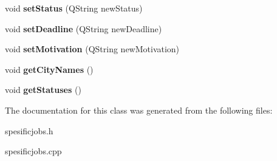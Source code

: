 \begin{DoxyCompactItemize}
\item 
\mbox{\label{class_spesific_jobs_a439307a28196221b7e3877983077812f}} 
void {\bfseries set\+Status} (Q\+String new\+Status)
\item 
\mbox{\label{class_spesific_jobs_a80ceb9ead40dc83e0adcf6ed2b3d5465}} 
void {\bfseries set\+Deadline} (Q\+String new\+Deadline)
\item 
\mbox{\label{class_spesific_jobs_a39df1f364b1ca8e3059094708f01983c}} 
void {\bfseries set\+Motivation} (Q\+String new\+Motivation)
\item 
\mbox{\label{class_spesific_jobs_acbf1efeeb4000a0a1238897daa74085b}} 
void {\bfseries get\+City\+Names} ()
\item 
\mbox{\label{class_spesific_jobs_ad1eead4bdf63388b3cbe0bb79b4b0d09}} 
void {\bfseries get\+Statuses} ()
\end{DoxyCompactItemize}


The documentation for this class was generated from the following files\+:\begin{DoxyCompactItemize}
\item 
spesificjobs.\+h\item 
spesificjobs.\+cpp\end{DoxyCompactItemize}
